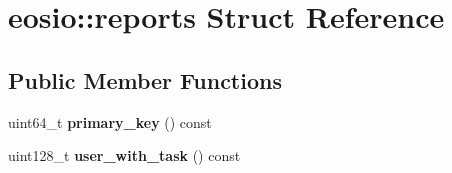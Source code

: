 \hypertarget{structeosio_1_1reports}{}\section{eosio\+:\+:reports Struct Reference}
\label{structeosio_1_1reports}
\subsection*{Public Member Functions}
\begin{DoxyCompactItemize}
\item 
\mbox{\label{structeosio_1_1reports_a5a1d26c5a3af5c8a44bb2f6f3bca02a3}} 
uint64\+\_\+t {\bfseries primary\+\_\+key} () const
\item 
\mbox{\label{structeosio_1_1reports_a04c574fa98f2519fecf35fec8db7eb64}} 
uint128\+\_\+t {\bfseries user\+\_\+with\+\_\+task} () const
\end{DoxyCompactItemize}
